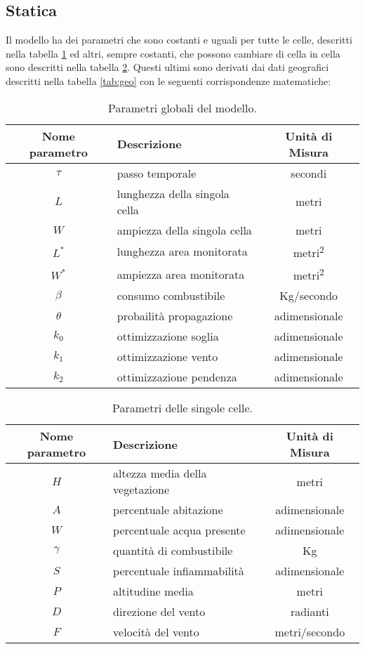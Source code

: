 \documentclass[draft]{article}
\newcommand{\combvar}{Kg}
\begin{document}

\subsection{Statica}\label{sec:statics}

Il modello ha dei parametri che sono costanti e uguali per tutte le celle,
descritti nella tabella \ref{tab:globals} ed altri, sempre costanti, che possono
cambiare di cella in cella sono descritti nella tabella \ref{tab:params}. Questi
ultimi sono derivati dai dati geografici descritti nella tabella \ref{tab:geo}
con le seguenti corrispondenze matematiche:

\begin{table}
\centering
\begin{tabular}{|c|l|c|}
	\hline
	\textbf{Nome parametro} & \textbf{Descrizione} & \textbf{Unità di Misura}\\
	\hline
	$\tau$ & passo temporale & secondi\\
	$L$ & lunghezza della singola cella & metri\\
	$W$ & ampiezza della singola cella & metri\\
	$L^*$ & lunghezza area monitorata & metri\textsuperscript{2}\\
	$W^*$ & ampiezza area monitorata & metri\textsuperscript{2}\\
	$\beta$ & consumo combustibile & \combvar/secondo\\
	$\theta$ & probailità propagazione & adimensionale\\
	$k_0$ & ottimizzazione soglia & adimensionale\\
	$k_1$ & ottimizzazione vento & adimensionale\\
	$k_2$ & ottimizzazione pendenza & adimensionale\\
	\hline
\end{tabular}
\caption{Parametri globali del modello.}
\label{tab:globals}
\end{table}

\begin{table}
\centering
\begin{tabular}{|c|l|c|}
	\hline
	\textbf{Nome parametro} & \textbf{Descrizione} & \textbf{Unità di Misura}\\
	\hline
	$H$ & altezza media della vegetazione & metri\\
	$A$ & percentuale abitazione & adimensionale\\
	$W$ & percentuale acqua presente & adimensionale\\
	$\gamma$ & quantità di combustibile & \combvar\\
	$S$ & percentuale infiammabilità & adimensionale\\
	$P$ & altitudine media & metri\\
	$D$ & direzione del vento & radianti\\
	$F$ & velocità del vento & metri/secondo\\
	\hline
\end{tabular}
\caption{Parametri delle singole celle.}
\label{tab:params}
\end{table}
\end{document}
